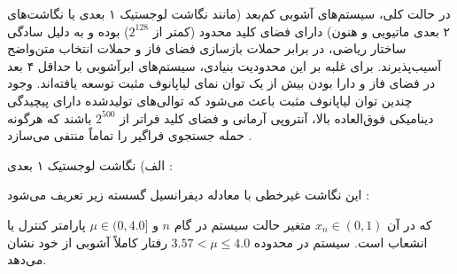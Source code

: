 

در حالت کلی، سیستم‌های آشوبی کم‌بعد (مانند نگاشت لوجستیک ۱ بعدی یا نگاشت‌های ۲ بعدی ماتیویی و هنون) دارای فضای کلید محدود (کمتر از $2^{128}$) بوده و به دلیل سادگی ساختار ریاضی، در برابر حملات بازسازی فضای فاز  و حملات انتخاب متن‌واضح  آسیب‌پذیرند. برای غلبه بر این محدودیت بنیادی، سیستم‌های ابرآشوبی  با حداقل ۴ بعد در فضای فاز و دارا بودن بیش از یک توان نمای لیاپانوف مثبت  توسعه یافته‌اند. وجود چندین توان لیاپانوف مثبت باعث می‌شود که توالی‌های تولیدشده دارای پیچیدگی دینامیکی فوق‌العاده بالا، آنتروپی آرمانی و فضای کلید فراتر از $2^{500}$ باشند که هرگونه حمله جستجوی فراگیر  را تماماً منتفی می‌سازد .\par




الف) نگاشت لوجستیک ۱ بعدی :\par

این نگاشت غیرخطی با معادله دیفرانسیل گسسته زیر تعریف می‌شود :\par






که در آن $x_n \in (0,\allowbreak{} 1)$ متغیر حالت سیستم در گام $n$ و $\mu \in (0,\allowbreak{} 4.0]$ پارامتر کنترل یا انشعاب  است. سیستم در محدوده $3.57 < \mu \le 4.0$ رفتار کاملاً آشوبی از خود نشان می‌دهد.\par

